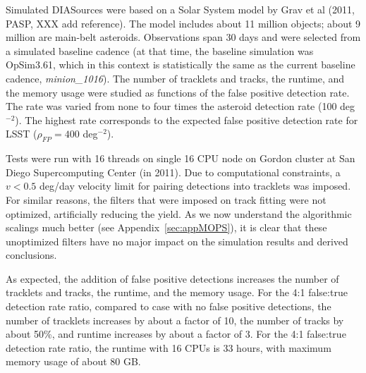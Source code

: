 Simulated DIASources were based on a Solar System model by Grav et al (2011, PASP, XXX add reference).
The model includes about 11 million objects; about 9 million are main-belt asteroids. Observations span
30 days and were selected from a simulated baseline cadence (at that time, the baseline simulation was
OpSim3.61, which in this context is statistically the same as the current baseline cadence, {\it minion\_1016}). 
The number of tracklets and tracks, the runtime, and the memory usage were studied as functions of 
the false positive detection rate. The rate was varied from none to four times the asteroid detection rate 
(100 deg$^{-2}$).  The highest rate corresponds to the expected false positive detection rate for LSST 
($\rho_{FP} =  400$ deg$^{-2}$). 

Tests were run with 16 threads on single 16 CPU node on Gordon cluster at San Diego Supercomputing
Center (in 2011). Due to computational constraints, a $v < 0.5$ deg/day velocity limit for pairing detections
into tracklets was imposed. For similar reasons, the filters that were imposed on track fitting were not 
optimized, artificially reducing the yield. As we now understand the algorithmic scalings much better 
(see Appendix~\ref{sec:appMOPS}), it is clear that these unoptimized filters have no major impact on the 
simulation results and derived conclusions. 

As expected, the addition of false positive detections increases the number of tracklets and tracks, 
the runtime, and the memory usage. For the 4:1 false:true detection rate ratio, compared to case with 
no false positive detections, the number of tracklets increases by about 
a factor of 10, the number of tracks by about 50\%, and runtime increases by about a factor of 3. 
For the 4:1 false:true detection rate ratio, the runtime with 16 CPUs is 33 hours, with maximum memory 
usage of about 80 GB.  




